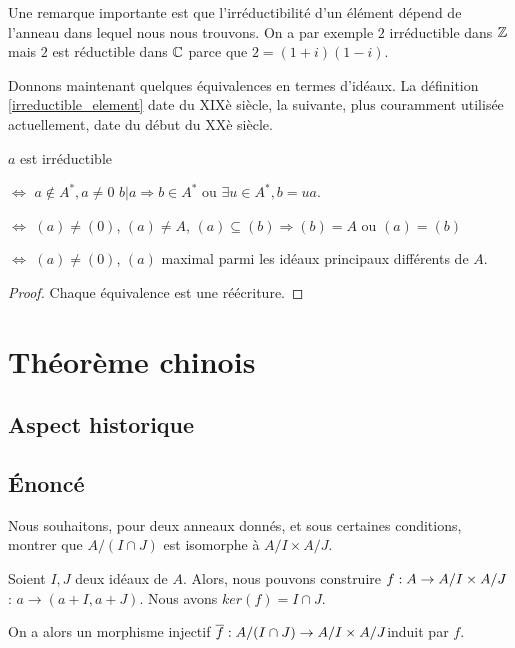 Une remarque importante est que l'irréductibilité d'un élément dépend de l'anneau
dans lequel nous nous trouvons. On a par exemple $2$ irréductible dans
$\mathbb{Z}$ mais $2$ est réductible dans $\mathbb{C}$ parce que $2 = (1 + i) (1 -
i)$.

Donnons maintenant quelques équivalences en termes d'idéaux. La définition
\ref{irreductible_element} date du XIXè siècle, la suivante, plus couramment
utilisée actuellement, date du début du XXè siècle.

\begin{proposition}

	$a$ est irréductible

	$\Leftrightarrow$
	$a \notin A^{*}, a \ne 0$ $b | a \Rightarrow b \in A^{*}$ ou $\exists u \in
	A^{*}, b = ua$.

	$\Leftrightarrow$
	$(a) \ne (0)$, $(a) \ne A$, $(a) \subseteq (b) \Rightarrow (b) = A$ ou $(a)
	= (b)$

	$\Leftrightarrow$
	$(a) \ne (0)$, $(a)$ maximal parmi les idéaux principaux différents de $A$.
\end{proposition}

\ifdefined\outputproof
\begin{proof}
	Chaque équivalence est une réécriture.
\end{proof}
\fi

\section{Théorème chinois}

\subsection{Aspect historique}

\subsection{Énoncé}
Nous souhaitons, pour deux anneaux donnés, et sous certaines conditions, montrer
que $A/(I \cap J)$ est isomorphe à $A/I \times A/J$.

Soient $I, J$ deux idéaux de $A$. Alors, nous pouvons construire
$f : A \rightarrow A/I \times A/J$ : $a \rightarrow (a + I, a + J)$.
Nous avons $ker(f) = I \cap J$.

On a alors un morphisme injectif $\overline{f} : A/(I \cap
J) \rightarrow A/I \times A/J$induit par $f$.

